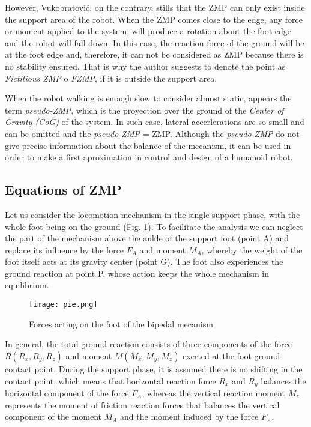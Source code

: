 However, Vukobratović, on the contrary, stills that the ZMP can only exist inside the support area of the robot. When the ZMP comes close to the edge, any force or moment applied to the system, will produce a rotation about the foot edge and the robot will fall down. In this case, the reaction force of the ground will be at the foot edge and, therefore, it can not be considered as ZMP because there is no stability ensured. That is why the author suggests to denote the point as \textit{Fictitious ZMP} o \textit{FZMP}, if it is outside the support area. 
 
When the robot walking is enough slow to consider almost static, appears the term \textit{pseudo-ZMP}, which is the proyection over the ground of the \textit{Center of Gravity (CoG)} of the system. In such case, lateral accerlerations are so small and can be omitted and the \textit{pseudo-ZMP} = ZMP. Although the \textit{pseudo-ZMP} do not give precise information about the balance of the mecanism, it can be used in order to make a first aproximation in control and design of a humanoid robot.



\subsection{Equations of ZMP}
Let us consider the locomotion mechanism in the single-support phase, with the whole foot being on the ground (Fig. \ref{fig:pie}). To facilitate the analysis we can neglect the part of the mechanism above the ankle of the support foot (point A) and replace its influence by the force $F_A$ and moment $M_A$, whereby the weight of the foot itself acts at its gravity center (point G). The foot also experiences the ground reaction at point P, whose action keeps the whole mechanism in equilibrium.

\begin{figure}[!hbt]
\centering
\texttt{[image: pie.png]}
\caption{Forces acting on the foot of the bipedal mecanism \protect\cite{Vuk2004} }
\label{fig:pie}
\end{figure}

In general, the total ground reaction consists of three components of the force $R (R_x, R_y, R_z)$ and moment $M (M_x, M_y, M_z)$ exerted at the foot-ground contact point. During the support phase, it is assumed there is no shifting in the contact point, which means that horizontal reaction force $R_x$ and $R_y$ balances the horizontal component of the force $F_A$, whereas the vertical reaction moment $M_z$ represents the moment of friction reaction forces that balances the vertical component of the moment $M_A$ and the moment induced by the force $F_A$.

